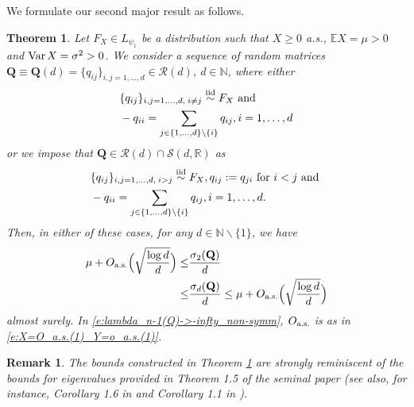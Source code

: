 \documentclass[9pt,twocolumn,twoside]{pnas-new}
\makeatletter
\newtheorem{Theorem}{Theorem}
\newcommand{\bbN}{{\mathbb N}}
\newcommand{\bbE}{{\mathbb E}}
\newcommand{\Var}{\textnormal{Var\hspace{0.5mm}}}
\newcommand{\?}{\textbf{?}}
\newcommand{\as}{\textnormal{a.s.}}
\newcommand{\QQ}{\mathbf{Q}}
\newcommand{\RR}{\mathbb{R}}
\newtheorem{@remark}{\bf Remark}
\newenvironment{remark}{\begin{@remark}\rm}{\end{@remark}}
\makeatother
\begin{document}
We formulate our second major result as follows. 
\begin{Theorem}\label{t:lambda_n-1(Q)->-infty_non-symm_a.s.}
  Let $F_X \in L_{\psi_1}$ be a distribution such that $X \geq 0$
  a.s., $\bbE X = \mu > 0$ and $\Var X = \sigma^2 > 0$. We consider a
  sequence of random matrices
  $\QQ \equiv \QQ(d) = \{q_{ij}\}_{i,j=1,\hdots,d} \in \mathcal{R}(d)$, $d \in \bbN$,
  where either
  \begin{align}\label{e:RM_theorem_general_condition}
    \begin{aligned}
  &\{q_{ij}\}_{i , j =1, \hdots, d, \hspace{0.75mm}i \neq j}
    \stackrel{\textnormal{iid}}\sim F_X
    \text{ and }\\
  &- q_{ii} = \sum_{j \in \{1,\hdots,d\} \backslash \{i\}}q_{ij},
  i=1,\hdots,d
  \end{aligned}
  \end{align}
  or we impose that $\QQ \in \mathcal{R}(d) \cap \mathcal{S}(d, \RR)$ as 
    \begin{align}
    \begin{aligned}\label{e:RM_theorem_symmetry_condition}
  &\{q_{ij}\}_{i , j =1, \hdots, d, \hspace{0.75mm}i > j}
  \stackrel{\textnormal{iid}}\sim F_X,
  q_{ij} := q_{ji} \text{ for } i < j
    \text{ and }\\
  &- q_{ii} = \sum_{j \in \{1,\hdots,d\} \backslash \{i\}}q_{ij},
  i=1,\hdots,d.
  \end{aligned}
\end{align}
    Then, in either of these cases, for any $d \in \bbN \backslash\{1\}$, we have
    \begin{align}
 \mu+ O_{\as}\Big(\sqrt{ \frac{\log d}{d}}\Big) \leq& \frac{\sigma_2(\QQ)}{d} 
 \notag \\
 \leq& \frac{\sigma_d(\QQ)}{d}
 \leq \mu+ O_{\as}\Big(\sqrt{ \frac{\log d}{d}}\Big)
 \label{e:lambda_n-1(Q)->-infty_non-symm}
      \end{align}
      almost surely. In \eqref{e:lambda_n-1(Q)->-infty_non-symm},
      $O_{\textnormal{a.s.}}$ is as in
      \eqref{e:X=O_a.s.(1)_Y=o_a.s.(1)}.
\end{Theorem}

\begin{remark}
  The bounds constructed in Theorem
  \ref{t:lambda_n-1(Q)->-infty_non-symm_a.s.} are strongly reminiscent
  of the bounds for eigenvalues provided in Theorem 1.5 of the seminal
  paper \cite{bordenave:caputo:chafai:2014} (see also, for instance,
  Corollary 1.6 in \cite{bryc:dembo:jiang:2006} and Corollary 1.1 in
  \cite{ding:jiang:2010}).
\end{remark}
\end{document}
